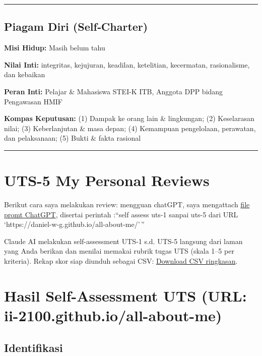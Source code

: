 \documentclass[
  letterpaper,
  DIV=11,
  numbers=noendperiod]{scrreprt}
\begin{document}
\begin{center}\rule{0.5\linewidth}{0.5pt}\end{center}

\section{Piagam Diri (Self‑Charter)}\label{piagam-diri-selfcharter}

\textbf{Misi Hidup:} Masih belum tahu

\textbf{Nilai Inti:} integritas, kejujuran, keadilan, ketelitian,
kecermatan, rasionalisme, dan kebaikan

\textbf{Peran Inti:} Pelajar \& Mahasiswa STEI-K ITB, Anggota DPP bidang
Pengawasan HMIF

\textbf{Kompas Keputusan:} (1) Dampak ke orang lain \& lingkungan; (2)
Keselarasan nilai; (3) Keberlanjutan \& masa depan; (4) Kemampuan
pengelolaan, perawatan, dan pelaksanaan; (5) Bukti \& fakta rasional

\begin{center}\rule{0.5\linewidth}{0.5pt}\end{center}


\chapter{UTS-5 My Personal Reviews}\label{uts-5-my-personal-reviews}

Berikut cara saya melakukan review: mengguan chatGPT, saya mengattach
\href{skor_uts.pdf}{file promt ChatGPT}, disertai perintah :``self
assess uts-1 sanpai uts-5 dari URL
`https://daniel-w-g.github.io/all-about-me/'\,''

Claude AI melakukan self-assessment UTS-1 s.d. UTS-5 langsung dari laman
yang Anda berikan dan menilai memakai rubrik tugas UTS (skala 1--5 per
kriteria). Rekap skor siap diunduh sebagai CSV: \href{skor.csv}{Download
CSV ringkasan}.


\chapter{Hasil Self-Assessment UTS (URL:
ii-2100.github.io/all-about-me)}\label{hasil-self-assessment-uts-url-ii-2100.github.ioall-about-me}

\section{Identifikasi}\label{identifikasi}
\end{document}
